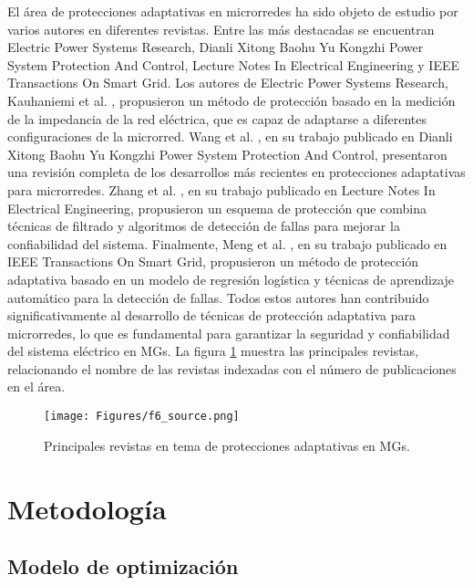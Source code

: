 \documentclass[journal,article,submit,pdftex,moreauthors]{Definitions/mdpi}
\begin{document}
El área de protecciones adaptativas en microrredes ha sido objeto de estudio por varios autores en diferentes revistas. Entre las más destacadas se encuentran Electric Power Systems Research, Dianli Xitong Baohu Yu Kongzhi Power System Protection And Control, Lecture Notes In Electrical Engineering y IEEE Transactions On Smart Grid. Los autores de Electric Power Systems Research, Kauhaniemi et al. \cite{kauhaniemi2016adaptive}, propusieron un método de protección basado en la medición de la impedancia de la red eléctrica, que es capaz de adaptarse a diferentes configuraciones de la microrred. Wang et al. \cite{wang2019review}, en su trabajo publicado en Dianli Xitong Baohu Yu Kongzhi Power System Protection And Control, presentaron una revisión completa de los desarrollos más recientes en protecciones adaptativas para microrredes. Zhang et al. \cite{zhang2018microgrid}, en su trabajo publicado en Lecture Notes In Electrical Engineering, propusieron un esquema de protección que combina técnicas de filtrado y algoritmos de detección de fallas para mejorar la confiabilidad del sistema. Finalmente, Meng et al. \cite{meng2019adaptive}, en su trabajo publicado en IEEE Transactions On Smart Grid, propusieron un método de protección adaptativa basado en un modelo de regresión logística y técnicas de aprendizaje automático para la detección de fallas. Todos estos autores han contribuido significativamente al desarrollo de técnicas de protección adaptativa para microrredes, lo que es fundamental para garantizar la seguridad y confiabilidad del sistema eléctrico en MGs. La figura \ref{fig:rvw_source} muestra las principales revistas, relacionando el nombre de las revistas indexadas con el número de publicaciones en el área. 

\begin{figure}[H]
    \centering
    \texttt{[image: Figures/f6\_source.png]}
    \caption{Principales revistas en tema de protecciones adaptativas en MGs.}
    \label{fig:rvw_source}
\end{figure}
\unskip



\section{Metodología}

\subsection{Modelo de optimización}
\end{document}
